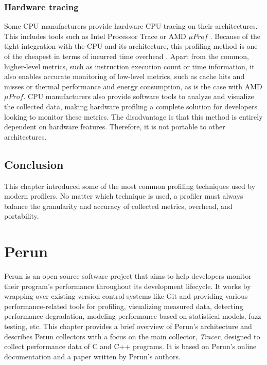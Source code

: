 \subsection{Hardware tracing}
Some CPU manufacturers provide hardware CPU tracing on their architectures. This includes tools such as Intel Processor Trace \cite{int-proc-trace} or AMD $\mu{Prof}$ \cite{uprof}. Because of the tight integration with the CPU and its architecture, this profiling method is one of the cheapest in terms of incurred time overhead \cite{hardware-profiling}. Apart from the common, higher-level metrics, such as instruction execution count or time information, it also enables accurate monitoring of low-level metrics, such as cache hits and misses or thermal performance and energy consumption, as is the case with AMD $\mu Prof$. CPU manufacturers also provide software tools to analyze and visualize the collected data, making hardware profiling a complete solution for developers looking to monitor these metrics. The disadvantage is that this method is entirely dependent on hardware features. Therefore, it is not portable to other architectures.


\section{Conclusion}
This chapter introduced some of the most common profiling techniques used by modern profilers. No matter which technique is used, a profiler must always balance the granularity and accuracy of collected metrics, overhead, and portability.

\chapter{Perun}
\label{perun}
Perun is an open-source software project that aims to help developers monitor their program's performance throughout its development lifecycle. It works by wrapping over existing version control systems like Git and providing various performance-related tools for profiling, visualizing measured data, detecting performance degradation, modeling performance based on statistical models, fuzz testing, etc. This chapter provides a brief overview of Perun's architecture and describes Perun collectors with a focus on the main collector, \emph{Tracer}, designed to collect performance data of C and C++ programs. It is based on Perun's online documentation \cite{perun-docs} and a paper written by Perun's authors. \cite{perun-paper}


